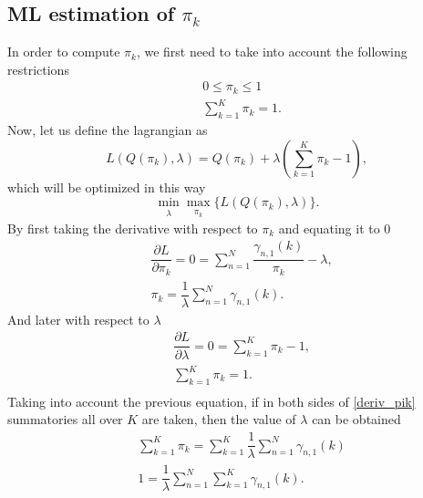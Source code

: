\documentclass[12pt]{article}%
\begin{document}
\subsection{ML estimation of $\pi_{k}$}
In order to compute $\pi_{k}$, we first need to take into account the following restrictions
\begin{align}
& 0 \leq \pi_{k} \leq 1 \\
& \sum\limits_{k = 1}^{K} \pi_{k} = 1.
\end{align}
Now, let us define the lagrangian as
\begin{equation}
\label{lagrange_pik}
L\left( Q(\pi_{k}),\lambda \right) = Q(\pi_{k}) + \lambda \left( \sum \limits_{k=1}^{K} \pi_{k} - 1 \right),
\end{equation}
which will be optimized in this way
\begin{equation}
\label{minmax_lagrange_pik}
\min_{\substack{\lambda}} \max_{\substack{\pi_{k}}} \lbrace L\left( Q(\pi_{k}),\lambda \right) \rbrace.
\end{equation}
By first taking the derivative with respect to $\pi_{k}$ and equating it to 0
\begin{equation}
\label{deriv_pik}
\begin{split}
& \dfrac{\partial L}{\partial \pi_{k}} = 0 = \sum \limits_{n=1}^{N} \dfrac{\gamma_{n,1}(k)}{\pi_{k}} - \lambda, \\
& \pi_{k} = \dfrac{1}{\lambda} \sum \limits_{n=1}^{N} \gamma_{n,1}(k).
\end{split}
\end{equation}
And later with respect to $\lambda$
\begin{equation}
\begin{split}
& \dfrac{\partial L}{\partial \lambda} = 0 = \sum \limits_{k=1}^{K} \pi_{k} - 1,\\
& \sum \limits_{k=1}^{K} \pi_{k} = 1.\\
\end{split}
\end{equation}
Taking into account the previous equation, if in both sides of \eqref{deriv_pik} summatories all over $K$ are taken, then the value of $\lambda$ can be obtained
\begin{equation}
\begin{split}
& \sum \limits_{k=1}^{K}\pi_{k} = \sum \limits_{k=1}^{K} \dfrac{1}{\lambda} \sum \limits_{n=1}^{N} \gamma_{n,1}(k)\\
& 1 = \dfrac{1}{\lambda} \sum \limits_{n=1}^{N}\sum \limits_{k=1}^{K}\gamma_{n,1}(k).\\
\end{split}
\end{equation}
\end{document}
